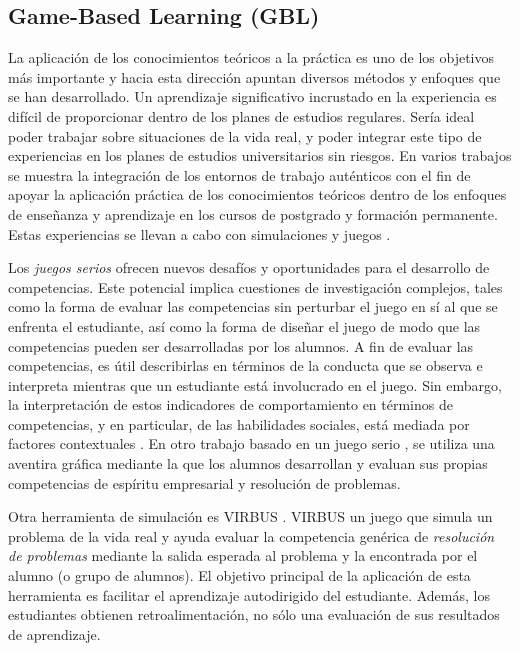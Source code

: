 \subsection{Game-Based Learning (GBL)} 
La aplicación de los conocimientos teóricos a la práctica es uno de los objetivos más importante y hacia esta dirección apuntan diversos métodos y enfoques que se han desarrollado. Un aprendizaje significativo incrustado en la experiencia es difícil de proporcionar dentro de los planes de estudios regulares. Sería ideal poder trabajar sobre situaciones de la vida real, y poder integrar este tipo de experiencias en los planes de estudios universitarios sin riesgos. En varios trabajos se muestra la integración de los entornos de trabajo auténticos con el fin de apoyar la aplicación práctica de los conocimientos teóricos dentro de los enfoques de enseñanza y aprendizaje en los cursos de postgrado y formación permanente. Estas experiencias se llevan a cabo con simulaciones y juegos \cite{Petersen:2012,Borrajo:2010}.

Los \emph{juegos serios} ofrecen nuevos desafíos y oportunidades para el desarrollo de competencias. Este potencial implica cuestiones de investigación complejos, tales como la forma de evaluar las competencias sin perturbar el juego en sí al que se enfrenta el estudiante, así como la forma de diseñar el juego de modo que las competencias pueden ser desarrolladas por los alumnos. A fin de evaluar las competencias, es útil describirlas en términos de la conducta que se observa e interpreta mientras que un estudiante está involucrado en el juego. Sin embargo, la interpretación de estos indicadores de comportamiento en términos de competencias, y en particular, de las habilidades sociales, está mediada por factores contextuales \cite{Bedek:2011}. En otro trabajo basado en un juego serio \cite{Guenaga:2013}, se utiliza una aventira gráfica mediante la que los alumnos desarrollan y evaluan sus propias competencias de espíritu empresarial y resolución de problemas.

Otra herramienta de simulación es VIRBUS \cite{Starcic:2008,Starcic:2008a}. VIRBUS un juego que simula un problema de la vida real y ayuda evaluar la competencia genérica de \emph{resolución de problemas} mediante la salida esperada al problema y la encontrada por el alumno (o grupo de alumnos). El objetivo principal de la aplicación de esta herramienta es facilitar el aprendizaje autodirigido del estudiante. Además, los estudiantes obtienen retroalimentación, no sólo una evaluación de sus resultados de aprendizaje.


